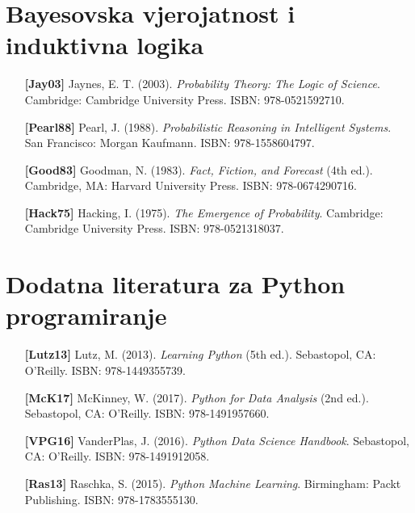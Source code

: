 \section{Bayesovska vjerojatnost i induktivna logika}

\begin{itemize}[leftmargin=2cm, labelsep=0.5cm, itemsep=0.3cm]

\item[\textbf{[Jay03]}] Jaynes, E. T. (2003). \textit{Probability Theory: The Logic of Science}. Cambridge: Cambridge University Press. ISBN: 978-0521592710.

\item[\textbf{[Pearl88]}] Pearl, J. (1988). \textit{Probabilistic Reasoning in Intelligent Systems}. San Francisco: Morgan Kaufmann. ISBN: 978-1558604797.

\item[\textbf{[Good83]}] Goodman, N. (1983). \textit{Fact, Fiction, and Forecast} (4th ed.). Cambridge, MA: Harvard University Press. ISBN: 978-0674290716.

\item[\textbf{[Hack75]}] Hacking, I. (1975). \textit{The Emergence of Probability}. Cambridge: Cambridge University Press. ISBN: 978-0521318037.

\end{itemize}

\section{Dodatna literatura za Python programiranje}

\begin{itemize}[leftmargin=2cm, labelsep=0.5cm, itemsep=0.3cm]

\item[\textbf{[Lutz13]}] Lutz, M. (2013). \textit{Learning Python} (5th ed.). Sebastopol, CA: O'Reilly. ISBN: 978-1449355739.

\item[\textbf{[McK17]}] McKinney, W. (2017). \textit{Python for Data Analysis} (2nd ed.). Sebastopol, CA: O'Reilly. ISBN: 978-1491957660.

\item[\textbf{[VPG16]}] VanderPlas, J. (2016). \textit{Python Data Science Handbook}. Sebastopol, CA: O'Reilly. ISBN: 978-1491912058.

\item[\textbf{[Ras13]}] Raschka, S. (2015). \textit{Python Machine Learning}. Birmingham: Packt Publishing. ISBN: 978-1783555130.

\end{itemize}

